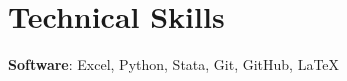 \documentclass[letterpaper,11pt]{article}
\makeatletter
\newcommand{\resumeItem}[1]{
  \item\small{
    {#1 \vspace{-2pt}}
  }
}
\newcommand{\resumeProjectHeading}[2]{
    \item
    \begin{tabular*}{0.97\textwidth}{l@{\extracolsep{\fill}}r}
      \small#1 & #2 \\
    \end{tabular*}\vspace{-7pt}
}
\newcommand{\resumeSubHeadingListStart}{\begin{itemize}[leftmargin=0.15in, label={}]}
\newcommand{\resumeSubHeadingListEnd}{\end{itemize}}
\newcommand{\resumeItemListStart}{\begin{itemize}}
\newcommand{\resumeItemListEnd}{\end{itemize}\vspace{-5pt}}
\makeatother
\begin{document}



%
\section{Technical Skills}

 \begin{itemize}[leftmargin=0.15in, label={}]
    \small{\item{
     \textbf{Software}{: Excel, Python, Stata, Git, GitHub, \LaTeX} \\
    }}
 \end{itemize}


\end{document}
